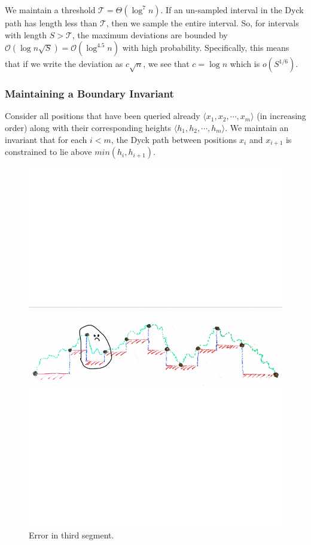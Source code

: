 We maintain a threshold $\mathcal T = \Theta(\log^7 n)$.
If an un-sampled interval in the Dyck path has length less than $\mathcal T$, then we sample the entire interval.
So, for intervals with length $S > \mathcal T$,
the maximum deviations are bounded by $\mathcal O(\log n\sqrt S) = \mathcal O(\log^{4.5}n)$ with high probability.
Specifically, this means that if we write the deviation as $c\sqrt n$, we see that $c = \log n$ which is $o(S^{1/6})$.


\subsubsection{Maintaining a Boundary Invariant}%
\label{sec:maintaining_a_boundary_invariant}
Consider all positions that have been queried already $ \langle x_1, x_2,\cdots, x_m \rangle$ (in increasing order)
along with their corresponding heights $ \langle h_1, h_2,\cdots, h_m \rangle$.
We maintain an invariant that for each $i < m$,
the Dyck path between positions $x_i$ and $x_{i+1}$ is constrained to lie above $min(h_i, h_{i+1})$.
\begin{figure}[htpb]
    \centering
    \includegraphics[width=1.0\linewidth, trim={0 12cm 0 12cm}]{images/dyck_boundary_invariant.pdf}
    \caption{Error in third segment.}
    \label{fig:dyck_boundary_invariant}
\end{figure}

